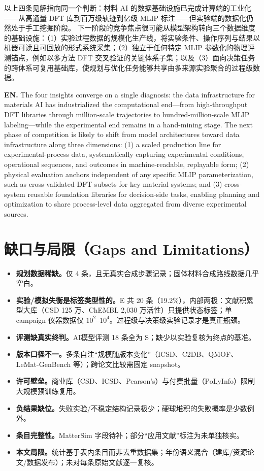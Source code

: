 \documentclass[11pt,a4paper]{ctexart}
\begin{document}
以上四条见解指向同一个判断：材料 AI 的数据基础设施已完成计算端的工业化——从高通量 DFT 库到百万级轨迹到亿级 MLIP 标注——但实验端的数据化仍然处于手工挖掘阶段。
下一阶段的竞争焦点很可能从模型架构转向三个数据维度的基础设施：（1）实验过程数据的规模化生产线，将实验条件、操作序列与结果以机器可读且可回放的形式系统采集；（2）独立于任何特定 MLIP 参数化的物理评测锚点，例如以多方法 DFT 交叉验证的关键体系子集；以及（3）面向决策任务的跨体系可复用基础库，使规划与优化任务能够共享由多来源实验聚合的过程级数据。

\textbf{EN.} The four insights converge on a single diagnosis: the data infrastructure for materials AI has industrialized the computational end---from high-throughput DFT libraries through million-scale trajectories to hundred-million-scale MLIP labeling---while the experimental end remains in a hand-mining stage. The next phase of competition is likely to shift from model architectures toward data infrastructure along three dimensions: (1) a scaled production line for experimental-process data, systematically capturing experimental conditions, operational sequences, and outcomes in machine-readable, replayable form; (2) physical evaluation anchors independent of any specific MLIP parameterization, such as cross-validated DFT subsets for key material systems; and (3) cross-system reusable foundation libraries for decision-side tasks, enabling planning and optimization to share process-level data aggregated from diverse experimental sources.

\section{缺口与局限（Gaps and Limitations）}

\begin{itemize}
\item \textbf{规划数据稀缺。}仅 4 条，且无真实合成步骤记录；固体材料合成路线数据几乎空白。
\item \textbf{实验/模拟失衡是标签类型性的。}E 共 20 条（19.2\%），内部两极：文献积累型大库（CSD 125 万、ChEMBL 2,030 万活性）只提供状态标签；单 campaign 仪器数据仅 $10^2$--$10^4$。过程级与决策级实验记录才是真正瓶颈。
\item \textbf{评测缺真实终判。}AI模型评测 18 条全为 S；缺少以实验复核为终点的基准。
\item \textbf{版本口径不一。}多条自注``规模随版本变化''（ICSD、C2DB、QMOF、LeMat-GenBench 等）；跨论文比较需固定 snapshot。
\item \textbf{许可壁垒。}商业库（CSD、ICSD、Pearson's）与付费批量（PoLyInfo）限制大规模预训练复用。
\item \textbf{负结果缺位。}失败实验/不稳定结构记录极少；硬球堆积的失败概率是少数例外。
\item \textbf{条目完整性。}MatterSim 字段待补；部分``应用文献''标注为未单独核实。
\item \textbf{本文局限。}统计基于表内条目而非去重数据集；年份语义混合（建库/资源论文/数据发布）；未对每条原始文献逐一复核。
\end{itemize}
\end{document}
